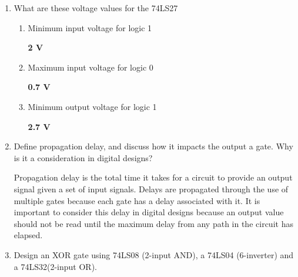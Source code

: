 \documentclass[CMPE]{KGCOEReport}
\begin{document}
\begin{enumerate}
  \item What are these voltage values for the 74LS27
  \begin{enumerate}
  	\item Minimum input voltage for logic 1
  	
  	\textbf{2 V}
  	
  	\item Maximum input voltage for logic 0
  	
  	\textbf{0.7 V}
  	
  	\item Minimum output voltage for logic 1
  	
  	\textbf{2.7 V}
  \end{enumerate}
  
  \item Define propagation delay, and discuss how it impacts the output a gate. Why is it a consideration in digital designs?
  
  Propagation delay is the total time it takes for a circuit to provide an output signal given a set of input signals. Delays are propagated through the use of multiple gates because each gate has a delay associated with it. It is important to consider this delay in digital designs because an output value should not be read until the maximum delay from any path in the circuit has elapsed.
  
  \item Design an XOR gate using 74LS08 (2-input AND), a 74LS04 (6-inverter) and a 74LS32(2-input OR). 
\end{enumerate}
\end{document}
